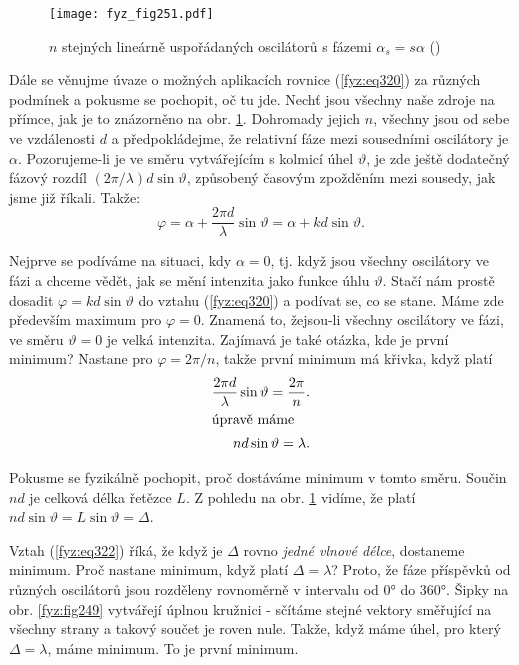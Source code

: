     \begin{figure}[ht!] %
      \centering
      \texttt{[image: fyz\_fig251.pdf]}
      \caption{\(n\) stejných lineárně uspořádaných oscilátorů s fázemi \(\alpha_s = s\alpha\)
               (\cite[s.~394]{Feynman01})}
      \label{fyz:fig251}
    \end{figure}

    Dále se věnujme úvaze o možných aplikacích rovnice (\ref{fyz:eq320}) za různých podmínek a 
    pokusme se pochopit, oč tu jde. Nechť jsou všechny naše zdroje na přímce, jak je to znázorněno 
    na obr. \ref{fyz:fig251}. Dohromady jejich \(n\), všechny jsou od sebe ve vzdálenosti \(d\) a 
    předpokládejme, že relativní fáze mezi sousedními oscilátory je \(\alpha\). Pozorujeme-li je ve 
    směru vytvářejícím s kolmicí úhel \(\vartheta\), je zde ještě dodatečný fázový rozdíl 
    \((2\pi/\lambda)d\sin\vartheta\), způsobený časovým zpožděním mezi sousedy, jak jsme již 
    říkali. Takže:
    \begin{equation}\label{fyz:eq321}
      \varphi = \alpha + \frac{2\pi d}{\lambda}\sin\vartheta = \alpha + kd\sin\vartheta.
    \end{equation}
    
    Nejprve se podíváme na situaci, kdy \(\alpha = 0\), tj. když jsou všechny oscilátory ve fázi a 
    chceme vědět, jak se mění intenzita jako funkce úhlu \(\vartheta\). Stačí nám prostě dosadit 
    \(\varphi = kd\sin\vartheta\) do vztahu (\ref{fyz:eq320}) a podívat se, co se stane. Máme zde 
    především maximum pro \(\varphi=0\). Znamená to, žejsou-li všechny oscilátory ve fázi, ve směru 
    \(\vartheta = 0\) je velká intenzita. Zajímavá je také otázka, kde je první minimum? Nastane 
    pro \(\varphi = 2\pi/n\), takže první minimum má křivka, když platí 
    \begin{align}
      \frac{2\pi d}{\lambda}\sin\vartheta = \frac{2\pi}{n}. \nonumber \\
      \shortintertext{úpravě máme}  
      nd\sin\vartheta = \lambda.                            \label{fyz:eq322}
    \end{align}

    Pokusme se fyzikálně pochopit, proč dostáváme minimum v tomto směru. Součin \(nd\) je celková 
    délka řetězce \(L\). Z pohledu na obr. \ref{fyz:fig251} vidíme, že platí \(nd\sin\vartheta = L 
    \sin\vartheta = \Delta\).
    
    Vztah (\ref{fyz:eq322}) říká, že když je \(\Delta\) rovno \emph{jedné vlnové délce}, dostaneme 
    minimum. Proč nastane minimum, když platí \(\Delta = \lambda\)? Proto, že fáze příspěvků od 
    různých oscilátorů jsou rozděleny rovnoměrně v intervalu od \ang{0} do \ang{360}. Šipky na obr. 
    \ref{fyz:fig249} vytvářejí úplnou kružnici - sčítáme stejné vektory směřující na všechny strany 
    a takový součet je roven nule. Takže, když máme úhel, pro který \(\Delta = \lambda\), máme 
    minimum. To je první minimum.
    
